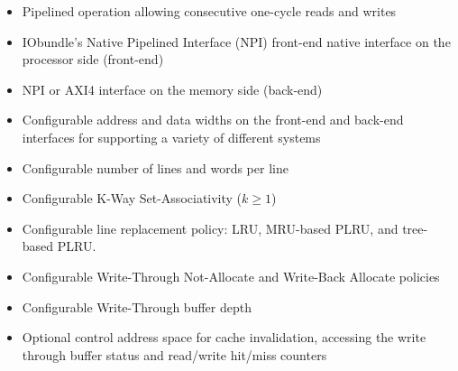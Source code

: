 %

\begin{itemize}
  \itemsep-0.5em
\item Pipelined operation allowing consecutive one-cycle reads and writes
\item IObundle's Native Pipelined Interface (NPI) front-end native interface on the processor side (front-end)
\item NPI or AXI4 interface on the memory side (back-end)
\item Configurable address and data widths on the front-end and back-end interfaces for supporting a variety of different systems
\item Configurable number of lines and words per line
\item Configurable K-Way Set-Associativity ($k \geq 1$)
\item Configurable line replacement policy: LRU, MRU-based PLRU, and tree-based PLRU.
\item Configurable Write-Through Not-Allocate and Write-Back Allocate policies
\item Configurable Write-Through buffer depth
\item Optional control address space for cache invalidation, accessing the write through buffer status and read/write hit/miss counters
\end{itemize}
